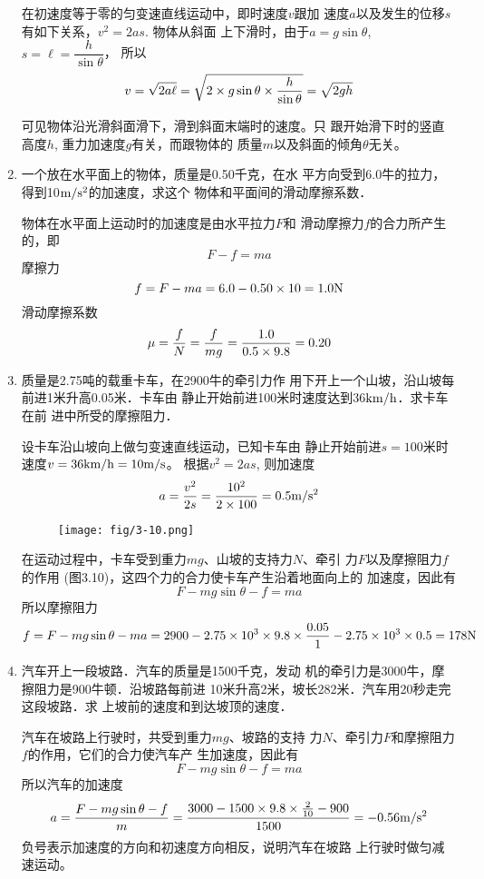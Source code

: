 \begin{enumerate}
\begin{solution}
在初速度等于零的匀变速直线运动中，即时速度$v$跟加
速度$a$以及发生的位移$s$有如下关系，$v^2=2as$. 物体从斜面
上下滑时，由于$a=g\sin\theta$, $s=\ell=\dfrac{h}{\sin\theta}$，
所以
\[v=\sqrt{2a\ell}=\sqrt{2\times g\sin\theta\times \frac{h}{\sin\theta}}=\sqrt{2gh}\]

可见物体沿光滑斜面滑下，滑到斜面末端时的速度。只
跟开始滑下时的竖直高度$h$, 重力加速度$g$有关，而跟物体的
质量$m$以及斜面的倾角$\theta$无关。
\end{solution}
\item  一个放在水平面上的物体，质量是0.50千克，在水
平方向受到6.0牛的拉力，得到10$\text{m}/\text{s}^2$的加速度，求这个
物体和平面间的滑动摩擦系数．

\begin{solution}
    物体在水平面上运动时的加速度是由水平拉力$F$和
滑动摩擦力$f$的合力所产生的，即
\[F-f=ma\]
摩擦力
\[f=F-ma=6.0-0.50\times10=1.0{\rm N}\]
滑动摩擦系数
\[\mu =\frac{f}{N}=\frac{f}{mg}=\frac{1.0}{0.5\times 9.8}=0.20\]
\end{solution}
\item   质量是2.75吨的载重卡车，在2900牛的牵引力作
用下开上一个山坡，沿山坡每前进1米升高0.05米．卡车由
静止开始前进100米时速度达到36$\text{km}/\text{h}$．求卡车在前
进中所受的摩擦阻力．

\begin{solution}
 设卡车沿山坡向上做匀变速直线运动，已知卡车由
静止开始前进$s=100$米时速度$v=36\text{km}/\text{h}=10\text{m}/\text{s}$。
根据$v^2=2as$, 则加速度
\[a=\frac{v^2}{2s}=\frac{10^2}{2\times 100}=0.5\text{m}/\text{s}^2\]

\begin{figure}[htp]
    \centering
\texttt{[image: fig/3-10.png]}
    \caption{}
\end{figure}

在运动过程中，卡车受到重力$mg$、山坡的支持力$N$、牵引
力$F$以及摩擦阻力$f$的作用
(图3.10)，这四个力的合力使卡车产生沿着地面向上的
加速度，因此有
\[F-mg\sin\theta-f=ma\]
所以摩擦阻力
\[f=F-mg\sin\theta-ma=2900-2.75\times10^3\times9.8\times\frac{0.05}{1}-2.75\times 10^3\times 0.5=178{\rm N}\]
\end{solution}
\item  汽车开上一段坡路．汽车的质量是1500千克，发动
机的牵引力是3000牛，摩擦阻力是900牛顿．沿坡路每前进
10米升高2米，坡长282米．汽车用20秒走完这段坡路．求
上坡前的速度和到达坡顶的速度．

\begin{solution}
汽车在坡路上行驶时，共受到重力$mg$、坡路的支持
力$N$、牵引力$F$和摩擦阻力$f$的作用，它们的合力使汽车产
生加速度，因此有
\[F-mg\sin\theta-f=ma\]
所以汽车的加速度
\[a=\frac{F-mg\sin\theta-f}{m}=\frac{3000-1500\times9.8\times\frac{2}{10}-900}{1500}=-0.56\text{m}/\text{s}^2\]
负号表示加速度的方向和初速度方向相反，说明汽车在坡路
上行驶时做匀减速运动。


\end{solution}
\end{enumerate}
